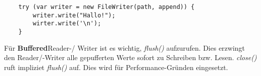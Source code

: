 \begin{lstlisting}
	try (var writer = new FileWriter(path, append)) {
		writer.write("Hallo!");
		wirter.write('\n');
	}
\end{lstlisting}

\noindent Für \textbf{Buffered}Reader-/ Writer ist es wichtig, \textit{flush()} aufzurufen. Dies erzwingt den Reader/-Writer alle gepufferten Werte sofort zu Schreiben bzw. Lesen. \textit{close()} ruft impliziet \textit{flush()} auf. Dies wird für Performance-Gründen eingesetzt.
